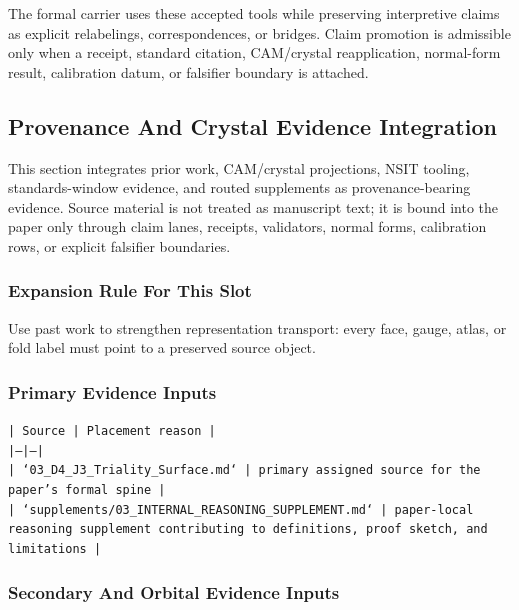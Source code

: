 \documentclass[11pt]{article}
\begin{document}
The formal carrier uses these accepted tools while preserving interpretive
claims as explicit relabelings, correspondences, or bridges. Claim promotion is admissible only when a receipt, standard citation,
CAM/crystal reapplication, normal-form result, calibration datum, or falsifier
boundary is attached.

\subsection*{Provenance And Crystal Evidence Integration}

This section integrates prior work, CAM/crystal projections, NSIT tooling,
standards-window evidence, and routed supplements as provenance-bearing
evidence. Source material is not treated as manuscript text; it is bound into
the paper only through claim lanes, receipts, validators, normal forms,
calibration rows, or explicit falsifier boundaries.

\subsubsection*{Expansion Rule For This Slot}

Use past work to strengthen representation transport: every face, gauge, atlas, or fold label must point to a preserved source object.

\subsubsection*{Primary Evidence Inputs}

\noindent\texttt{| Source | Placement reason |}\\
\noindent\texttt{|---|---|}\\
\noindent\texttt{| `03\_D4\_J3\_Triality\_Surface.md` | primary assigned source for the paper's formal spine |}\\
\noindent\texttt{| `supplements/03\_INTERNAL\_REASONING\_SUPPLEMENT.md` | paper-local reasoning supplement contributing to definitions, proof sketch, and limitations |}\\

\subsubsection*{Secondary And Orbital Evidence Inputs}
\end{document}
